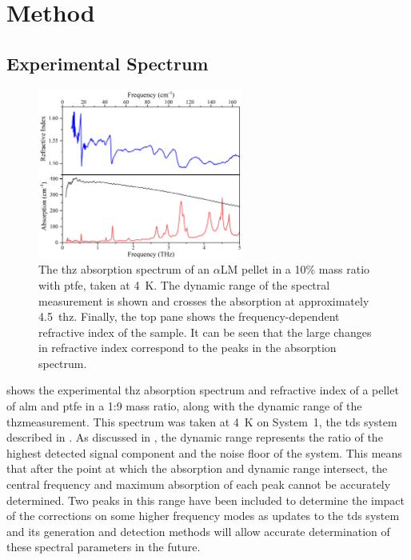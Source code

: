 \section{Method}
\subsection{Experimental Spectrum}
\begin{figure}[bh!]
    \centering
    \includegraphics[width=0.6\textwidth]{Figures/Spectra/AbsRefInd.png}
    \captionsetup{font = footnotesize, justification = centering}
    \caption[The THz Absorption Spectrum and Refractive Index of \(\alpha\)-Lactose Monohydrate]{The \acrshort{thz} absorption spectrum of an ${\alpha}$LM pellet in a 10\% mass ratio with \acrshort{ptfe}, taken at \SI{4}{K}. The dynamic range of the spectral measurement is shown and crosses the absorption at approximately \SI{4.5}{\acrshort{thz}}. Finally, the top pane shows the frequency\nobreakdash-dependent refractive index of the sample. It can be seen that the large changes in refractive index correspond to the peaks in the absorption spectrum.}
    \label{fig:AbsRefInd}
\end{figure}

 shows the experimental \acrshort{thz} absorption spectrum and refractive index of a pellet of \acrshort{alm} and \acrshort{ptfe} in a 1:9 mass ratio, along with the dynamic range of the \acrshort{thz}measurement. This spectrum was taken at \SI{4}{K} on  System~1, the \acrshort{tds} system described in . As discussed in , the dynamic range represents the ratio of the highest detected signal component and the noise floor of the system. This means that after the point at which the absorption and dynamic range intersect, the central frequency and maximum absorption of each peak cannot be accurately determined. Two peaks in this range have been included to determine the impact of the corrections on some higher frequency modes as updates to the \acrshort{tds} system and its generation and detection methods will allow accurate determination of these spectral parameters in the future. 


